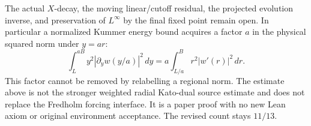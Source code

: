 The actual \(X\)-decay, the moving linear/cutoff residual, the projected
evolution inverse, and preservation of \(L^\infty\) by the final fixed
point remain open.  In particular a normalized Kummer energy bound
acquires a factor \(a\) in the physical squared norm under \(y=ar\):
\[
 \int_L^{aB}y^2|\partial_y w(y/a)|^2\,dy
  =a\int_{L/a}^B r^2|w'(r)|^2\,dr.
\]
This factor cannot be removed by relabelling a regional norm.
The estimate above is not the stronger weighted radial Kato-dual source
estimate and does not replace the Fredholm forcing interface.
It is a paper proof with no new Lean axiom or original environment
acceptance.  The revised count stays \(11/13\).
